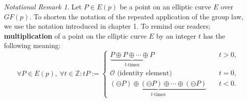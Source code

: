 \documentclass[thesis=M,english]{FITthesis}[2012/10/20]
\theoremstyle{remark}
\newtheorem*{NRM}{Notational Remark}
\theoremstyle{definition}
\begin{document}
\begin{NRM}
Let $P \in E(p)$ be a point on an elliptic curve $E$ over $GF(p)$. To shorten the notation of the repeated application of the group law, we use the notation introduced in chapter 1. To remind our readers; \textbf{multiplication} of a point on the elliptic curve $E$ by an integer $t$ has the following meaning:
$$
\forall P \in E(p),\ \forall t \in \mathbb{Z}: tP := \begin{cases} \underbrace{P \oplus P \oplus \cdots \oplus P}_{\text{$t$-times}} &\quad t > 0, \\
\mathcal{O} \text{ (identity element) } &\quad t = 0, \\
\underbrace{(\ominus P) \oplus (\ominus P) \oplus \cdots \oplus (\ominus P)}_{\text{$t$-times}} &\quad t < 0.
\end{cases}
$$
\end{NRM}
\end{document}
